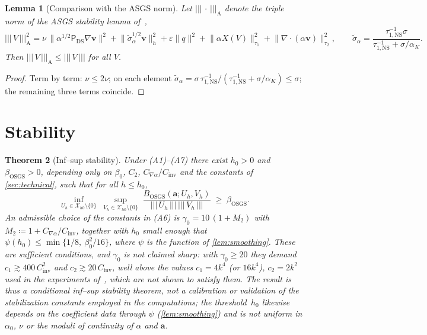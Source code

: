 \documentclass[11pt]{article}
\newtheorem{theorem}{Theorem}[section]
\newtheorem{lemma}[theorem]{Lemma}
\theoremstyle{remark}
\newcommand{\bv}{\boldsymbol{v}}
\newcommand{\ba}{\boldsymbol{a}}
\newcommand{\ViscProj}{\mathsf{P}_{\mathrm{DS}}}
\newcommand{\tnorm}[1]{\lvert\!\lvert\!\lvert\, #1 \,\rvert\!\rvert\!\rvert}
\newcommand{\tns}{\tau_{1,\mathrm{NS}}}
\newcommand{\Xhz}{\mathcal{X}_{h0}}
\begin{document}
\begin{lemma}[Comparison with the ASGS norm]
\label{lem:normcomparison}
Let $\tnorm{\cdot}_{\mathrm{A}}$ denote the triple norm of the ASGS stability lemma
of~\cite{companion},
\[
  \tnorm{V}_{\mathrm{A}}^2
  = \nu\,\bigl\lVert \alpha^{1/2}\ViscProj\nabla\bv \bigr\rVert^2
  + \bigl\lVert \widetilde{\sigma}_\alpha^{1/2}\bv \bigr\rVert_h^2
  + \varepsilon\bigl\lVert q\bigr\rVert^2
  + \bigl\lVert\alpha X(V)\bigr\rVert_{\tau_1}^2
  + \bigl\lVert\nabla\cdot(\alpha\bv)\bigr\rVert_{\tau_2}^2,
  \qquad
  \widetilde{\sigma}_\alpha
  = \frac{\tns^{-1}\sigma}{\tns^{-1} + \sigma/\alpha_K}.
\]
Then $\tnorm{V}_{\mathrm{A}} \le \tnorm{V}$ for all $V$.
\end{lemma}

\begin{proof}
Term by term: $\nu \le 2\nu$; on each element
$\widetilde{\sigma}_\alpha = \sigma\,\tns^{-1}/(\tns^{-1}+\sigma/\alpha_K) \le \sigma$;
the remaining three terms coincide.
\end{proof}

\section{Stability}
\label{sec:stability}

\begin{theorem}[Inf--sup stability]
\label{th:stability}
Under \textup{(A1)--(A7)} there exist $h_0 > 0$ and $\beta_{\mathrm{OSGS}} > 0$,
depending only on $\beta_0$, $C_2$, $C_{\nabla\alpha}/C_{\mathrm{inv}}$ and the constants of
\cref{sec:technical}, such that for all $h \le h_0$,
\begin{equation}
  \label{eq:InfSup}
  \inf_{U_h \in \Xhz\setminus\{0\}}\;
  \sup_{V_h \in \Xhz\setminus\{0\}}\;
  \frac{B_{\mathrm{OSGS}}(\ba; U_h, V_h)}{\tnorm{U_h}\,\tnorm{V_h}}
  \;\ge\; \beta_{\mathrm{OSGS}} .
\end{equation}
An admissible choice of the constants in \textup{(A6)} is
$\gamma_0 = 10\,(1 + M_2)$ with $M_2 \coloneqq 1 + C_{\nabla\alpha}/C_{\mathrm{inv}}$,
together with $h_0$ small enough that
$\psi(h_0) \le \min\{1/8,\ \beta_0^2/16\}$, where $\psi$ is the function of
\cref{lem:smoothing}. These are \emph{sufficient} conditions, and $\gamma_0$ is not claimed
sharp: with $\gamma_0 \ge 20$ they demand $c_1 \gtrsim 400\,C_{\mathrm{inv}}^2$ and
$c_2 \gtrsim 20\,C_{\mathrm{inv}}$, well above the values $c_1 = 4k^4$ (or $16k^4$),
$c_2 = 2k^2$ used in the experiments of~\cite{companion}, which are not shown to satisfy
them. The result is thus a \emph{conditional} inf--sup stability theorem, not a calibration
or validation of the stabilization constants employed in the computations; the
threshold~$h_0$ likewise depends on the coefficient data through $\psi$
(\cref{lem:smoothing}) and is not uniform in $\alpha_0$, $\nu$ or the moduli of continuity
of $\alpha$ and $\ba$.
\end{theorem}
\end{document}
